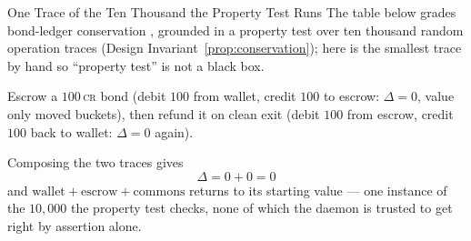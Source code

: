 \documentclass[11pt,a4paper]{article}
\theoremstyle{definition}
\theoremstyle{definition}
\theoremstyle{remark}
\begin{document}
\begin{pdexample}{One Trace of the Ten Thousand the Property Test Runs}
\setlength{\parskip}{4pt plus 1pt}
The table below grades bond-ledger conservation \Built{}, grounded in a
property test over ten thousand random operation traces
(Design Invariant~\ref{prop:conservation}); here is the smallest trace by hand
so ``property test'' is not a black box.

Escrow a $100$\,\textsc{cr} bond
(debit $100$ from wallet, credit $100$ to escrow: $\Delta=0$, value only moved
buckets), then refund it on clean exit (debit $100$ from escrow, credit $100$
back to wallet: $\Delta=0$ again).

Composing the two traces gives
\[
\Delta=0+0=0
\] and $\text{wallet}+\text{escrow}+\text{commons}$ returns to
its starting value --- one instance of the $10{,}000$ the property test checks,
none of which the daemon is trusted to get right by assertion alone.
\end{pdexample}
\end{document}
